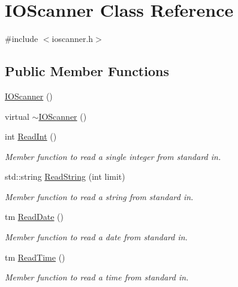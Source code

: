 \hypertarget{classIOScanner}{\section{\-I\-O\-Scanner \-Class \-Reference}
\label{classIOScanner}
}


{\ttfamily \#include $<$ioscanner.\-h$>$}

\subsection*{\-Public \-Member \-Functions}
\begin{DoxyCompactItemize}
\item 
\hyperlink{classIOScanner_a738f8672a1b98ce7edca8c1315982b69}{\-I\-O\-Scanner} ()
\item 
virtual \hyperlink{classIOScanner_a34d5d986a4e3c0d602c4837fc6cd9485}{$\sim$\-I\-O\-Scanner} ()
\item 
int \hyperlink{classIOScanner_a0fe8c5b740760937dbcd1e8fab7f91b9}{\-Read\-Int} ()
\begin{DoxyCompactList}\small\item\em \-Member function to read a single integer from standard in. \end{DoxyCompactList}\item 
std\-::string \hyperlink{classIOScanner_ae80cbd233c7da6a4756be74774772ea4}{\-Read\-String} (int limit)
\begin{DoxyCompactList}\small\item\em \-Member function to read a string from standard in. \end{DoxyCompactList}\item 
tm \hyperlink{classIOScanner_ab6196eddf07fed0ec799ac5114ed5ddb}{\-Read\-Date} ()
\begin{DoxyCompactList}\small\item\em \-Member function to read a date from standard in. \end{DoxyCompactList}\item 
tm \hyperlink{classIOScanner_ad88df6b3006a8a8c9c4fd07ad573232c}{\-Read\-Time} ()
\begin{DoxyCompactList}\small\item\em \-Member function to read a time from standard in. \end{DoxyCompactList}\end{DoxyCompactItemize}


